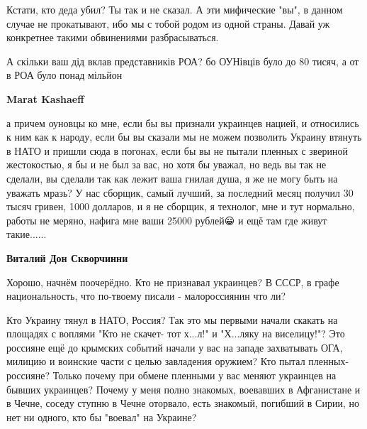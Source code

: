 \begin{itemize}
\begin{itemize}
Кстати, кто деда убил? Ты так и не сказал. А эти мифические "вы", в данном
случае не прокатывают, ибо мы с тобой родом из одной страны. Давай уж
конкретнее такими обвинениями разбрасываться.

 
А скільки ваш дід вклав представників РОА? бо ОУНівців було до 80 тисяч, а от в РОА було понад мільйон

 
\textbf{Marat Kashaeff} 

а причем оуновцы ко мне, если бы вы признали украинцев нацией, и относились к
ним как к народу, если бы вы сказали мы не можем позволить Украину втянуть в
НАТО и пришли сюда в погонах, если бы вы не пытали пленных с звериной
жестокостью, я бы и не был за вас, но хотя бы уважал, но ведь вы так не
сделали, вы сделали так как лежит ваша гнилая душа, я же не могу быть на
уважать мразь? У нас сборщик, самый лучший, за последний месяц получил 30 тысяч
гривен, 1000 долларов, и я не сборщик, я технолог, мне и тут нормально, работы
не меряно, нафига мне ваши 25000 рублей😀 и ещё там где живут такие......

 
\textbf{Виталий Дон Скворчинни} 

Хорошо, начнём поочерёдно. Кто не признавал украинцев? В СССР, в графе
национальность, что по-твоему писали - малороссиянин что ли? 

Кто Украину тянул в НАТО, Россия? Так это мы первыми начали скакать на площадях
с воплями "Кто не скачет- тот х...л!" и "Х...ляку на виселицу!"? Это россияне
ещё до крымских событий начали у вас на западе захватывать ОГА, милицию и
воинские части с целью завладения оружием? Кто пытал пленных- россияне? Только
почему при обмене пленными у вас меняют украинцев на бывших украинцев? Почему у
меня полно знакомых, воевавших в Афганистане и в Чечне, соседу ступню в Чечне
оторвало, есть знакомый, погибший в Сирии, но нет ни одного, кто бы "воевал" на
Украине?


\end{itemize}
\end{itemize}
